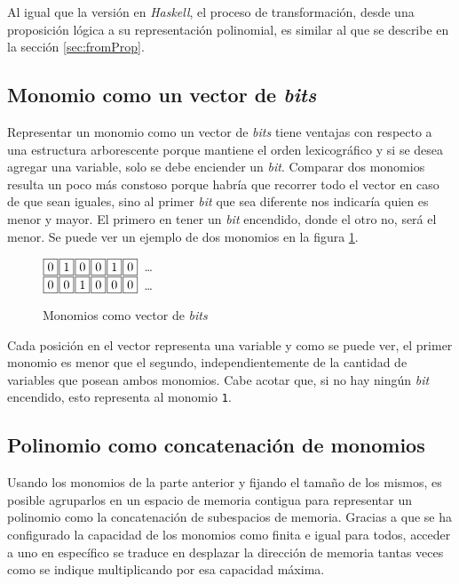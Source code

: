 Al igual que la versión en \textit{Haskell}, el proceso de transformación, desde una proposición lógica a su representación polinomial, es similar al que se describe en la sección \ref{sec:fromProp}.

\subsection{Monomio como un vector de \textit{bits}}

Representar un monomio como un vector de \textit{bits} tiene ventajas con respecto a una estructura arborescente porque mantiene el orden lexicográfico y si se desea agregar una variable, solo se debe enciender un \textit{bit}. Comparar dos monomios resulta un poco más constoso porque habría que recorrer todo el vector en caso de que sean iguales, sino al primer \textit{bit} que sea diferente nos indicaría quien es menor y mayor. El primero en tener un \textit{bit} encendido, donde el otro no, será el menor. Se puede ver un ejemplo de dos monomios en la figura \ref{fig:mbs}.

\begin{figure}
    \centering\noindent
    $\fbox{0} \hspace*{.1em} \fbox{1} \hspace*{.1em} \fbox{0} \hspace*{.1em} \fbox{0} \hspace*{.1em} \fbox{1} \hspace*{.1em} \fbox{0}$\ \dots\ \\
    \noindent
    $\fbox{0} \hspace*{.1em} \fbox{0} \hspace*{.1em} \fbox{1} \hspace*{.1em} \fbox{0} \hspace*{.1em} \fbox{0} \hspace*{.1em} \fbox{0}$\ \dots\
\caption{Monomios como vector de \textit{bits}}
\label{fig:mbs}
\end{figure}

Cada posición en el vector representa una variable y como se puede ver, el primer monomio es menor que el segundo, independientemente de la cantidad de variables que posean ambos monomios. Cabe acotar que, si no hay ningún \textit{bit} encendido, esto representa al monomio \texttt{1}.

\subsection{Polinomio como concatenación de monomios}

Usando los monomios de la parte anterior y fijando el tamaño de los mismos, es posible agruparlos en un espacio de memoria contigua para representar un polinomio como la concatenación de subespacios de memoria. Gracias a que se ha configurado la capacidad de los monomios como finita e igual para todos, acceder a uno en específico se traduce en desplazar la dirección de memoria tantas veces como se indique multiplicando por esa capacidad máxima.

